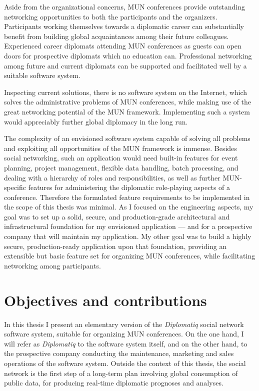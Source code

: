 Aside from the organizational concerns, MUN conferences provide outstanding networking opportunities to both the participants and the organizers. Participants working themselves towards a diplomatic career can substantially benefit from building global acquaintances among their future colleagues. Experienced career diplomats attending MUN conferences as guests can open doors for prospective diplomats which no education can. Professional networking among future and current diplomats can be supported and facilitated well by a suitable software system.

Inspecting current solutions, there is no software system on the Internet, which solves the administrative problems of MUN conferences, while making use of the great networking potential of the MUN framework. Implementing such a system would appreciably further global diplomacy in the long run.

The complexity of an envisioned software system capable of solving all problems and exploiting all opportunities of the MUN framework is immense. Besides social networking, such an application would need built-in features for event planning, project management, flexible data handling, batch processing, and dealing with a hierarchy of roles and responsibilities, as well as further MUN-specific features for administering the diplomatic role-playing aspects of a conference. Therefore the formulated feature requirements to be implemented in the scope of this thesis was minimal. As I focused on the engineering aspects, my goal was to set up a solid, secure, and production-grade architectural and infrastructural foundation for my envisioned application — and for a prospective company that will maintain my application. My other goal was to build a highly secure, production-ready application upon that foundation, providing an extensible but basic feature set for organizing MUN conferences, while facilitating networking among participants.

\section{Objectives and contributions}

In this thesis I present an elementary version of the \emph{Diplomatiq} social network software system, suitable for organizing MUN conferences. On the one hand, I will refer as \emph{Diplomatiq} to the software system itself, and on the other hand, to the prospective company conducting the maintenance, marketing and sales operations of the software system. Outside the context of this thesis, the social network is the first step of a long-term plan involving global consumption of public data, for producing real-time diplomatic prognoses and analyses.

